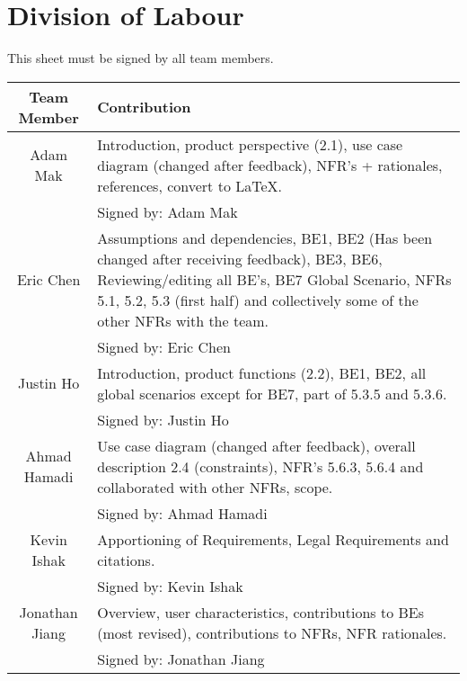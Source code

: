 \documentclass[]{article}
\begin{document}
\section{Division of Labour}
\label{sec:division_of_labour}
This sheet must be signed by all team members.
\begin{center} \begin{tabular} {|c|p{35em}|}
	\hline
	\textbf{Team Member} & \textbf{Contribution} \\
	\hline \hline
	Adam Mak & Introduction, product perspective (2.1), use case diagram (changed after feedback), NFR's + rationales, references, convert to LaTeX. \\
	& Signed by: Adam Mak \\
	\hline
	Eric Chen & Assumptions and dependencies, BE1, BE2 (Has been changed after receiving feedback), BE3, BE6, Reviewing/editing all BE's, BE7 Global Scenario, NFRs 5.1, 5.2, 5.3 (first half) and collectively some of the other NFRs with the team. \\
	& Signed by: Eric Chen \\
	\hline
	Justin Ho & Introduction, product functions (2.2), BE1, BE2, all global scenarios except for BE7, part of 5.3.5 and 5.3.6. \\
	& Signed by: Justin Ho \\
	\hline
	Ahmad Hamadi & Use case diagram (changed after feedback), overall description 2.4 (constraints), NFR's 5.6.3, 5.6.4 and collaborated with other NFRs, scope. \\
	& Signed by: Ahmad Hamadi \\
	\hline
	Kevin Ishak & Apportioning of Requirements, Legal Requirements and citations. \\
	& Signed by: Kevin Ishak \\
	\hline
	Jonathan Jiang & Overview, user characteristics, contributions to BEs (most revised), contributions to NFRs, NFR rationales. \\
	& Signed by: Jonathan Jiang \\
	\hline
\end{tabular} \end{center}
\end{document}
